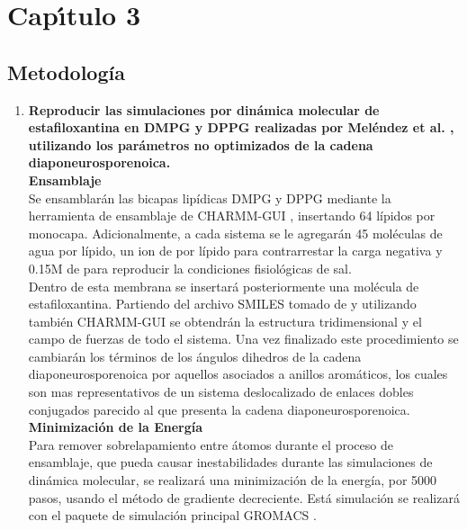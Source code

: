 \chapter{Cap\'{\i}tulo 3}
\section{Metodolog\'{i}a}

\begin{enumerate}
\item \textbf{Reproducir las simulaciones por din\'{a}mica molecular de estafiloxantina en DMPG y DPPG realizadas  por Mel\'{e}ndez et al. \cite{MelendezDelgado2018StudyingBilayers}, utilizando los par\'{a}metros no optimizados de la cadena diaponeurosporenoica.}\label{item:1}\\

\textbf{Ensamblaje}\\
Se ensamblar\'{a}n las bicapas lip\'{i}dicas DMPG y DPPG mediante la herramienta de ensamblaje de CHARMM-GUI \cite{Sunhwan2008CHARMM-GUI:CHARMM}, insertando 64 l\'{i}pidos por monocapa. Adicionalmente, a cada sistema se le agregar\'{a}n 45 mol\'{e}culas de agua por l\'{i}pido,  un ion de  por l\'{i}pido  para contrarrestar la carga negativa y 0.15M de  para reproducir la condiciones fisiol\'{o}gicas de sal.\\
Dentro de esta membrana se insertar\'{a} posteriormente una mol\'{e}cula de estafiloxantina. Partiendo del archivo SMILES tomado de \cite{NationalCenterforBiotechnologyInformationPubChemCID=24892781} y utilizando tambi\'{e}n CHARMM-GUI se obtendr\'{a}n la estructura tridimensional y el campo de fuerzas de todo el sistema. Una vez finalizado este procedimiento se cambiar\'{a}n los t\'{e}rminos de los \'{a}ngulos dihedros  de la cadena diaponeurosporenoica por aquellos asociados a anillos arom\'{a}ticos, los cuales son mas representativos de un sistema deslocalizado de enlaces dobles conjugados parecido al que presenta la cadena diaponeurosporenoica.\\
\textbf{Minimizaci\'{o}n de la Energ\'{i}a}\\
Para remover sobrelapamiento entre \'{a}tomos durante el proceso de ensamblaje, que pueda causar inestabilidades durante las simulaciones de din\'{a}mica molecular, se realizar\'{a} una minimizaci\'{o}n de la energ\'{i}a, por 5000 pasos, usando el m\'{e}todo de gradiente decreciente. Est\'{a} simulaci\'{o}n se realizar\'{a} con el paquete de simulaci\'{o}n principal GROMACS \cite{AbrahamGROMACS2019}.\\


\end{enumerate}
